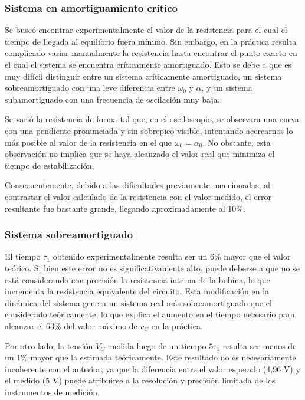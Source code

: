 \subsubsection{Sistema en amortiguamiento crítico}
Se buscó encontrar experimentalmente el valor de la resistencia para el cual el tiempo de llegada al equilibrio fuera mínimo. Sin embargo, en la práctica resulta complicado variar manualmente la resistencia hasta encontrar el punto exacto en el cual el sistema se encuentra críticamente amortiguado. Esto se debe a que es muy difícil distinguir entre un sistema críticamente amortiguado, un sistema sobreamortiguado con una leve diferencia entre $\omega_0$ y $\alpha$, y un sistema subamortiguado con una frecuencia de oscilación muy baja.

Se varió la resistencia de forma tal que, en el osciloscopio, se observara una curva con una pendiente pronunciada y sin sobrepico visible, intentando acercarnos lo más posible al valor de la resistencia en el que $\omega_0 = \alpha_0$. No obstante, esta observación no implica que se haya alcanzado el valor real que minimiza el tiempo de estabilización.

Consecuentemente, debido a las dificultades previamente mencionadas, al contrastar el valor calculado de la resistencia con el valor medido, el error resultante fue bastante grande, llegando aproximadamente al 10\%.

\subsubsection{Sistema sobreamortiguado}
El tiempo $\tau_1$ obtenido experimentalmente resulta ser un 6\% mayor que el valor teórico. Si bien este error no es significativamente alto, puede deberse a que no se está considerando con precisión la resistencia interna de la bobina, lo que incrementa la resistencia equivalente del circuito. Esta modificación en la dinámica del sistema genera un sistema real más sobreamortiguado que el considerado teóricamente, lo que explica el aumento en el tiempo necesario para alcanzar el $63\%$ del valor máximo de $v_C$ en la práctica.

Por otro lado, la tensión $V_C$ medida luego de un tiempo $5\tau_1$ resulta ser menos de un 1\% mayor que la estimada teóricamente. Este resultado no es necesariamente incoherente con el anterior, ya que la diferencia entre el valor esperado (4,96 V) y el medido (5 V) puede atribuirse a la resolución y precisión limitada de los instrumentos de medición.

